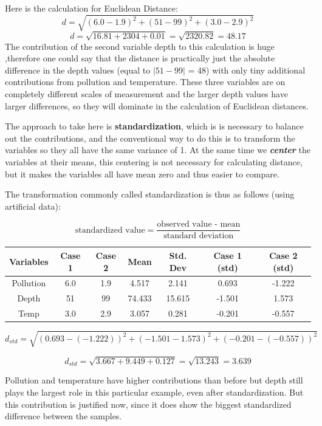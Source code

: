 \documentclass[a4paper,12pt]{report}
\begin{document}
Here is the calculation for Euclidean Distance:
\[ d = \sqrt{(6.0 - 1.9)^2 + (51 - 99)^2 + (3.0 - 2.9)^2}   \]
\[ d = \sqrt{16.81 + 2304 + 0.01} = \sqrt{2320.82} = 48.17 \]
\noindent The contribution of the second variable depth to this calculation is huge ,therefore one could say
that the distance is practically just the absolute difference in the depth values (equal to
$|51-99|$ = 48) with only tiny additional contributions from pollution and temperature. These three variables are on
completely different scales of measurement and the larger depth values have larger differences, so they will dominate in the calculation of Euclidean distances.


\noindent The approach to take here is \textbf{standardization}, which is is necessary to balance out the contributions, and the
conventional way to do this is to transform the variables so they all have the same variance
of 1. At the same time we \textbf{\textit{center}} the variables at their means, this centering is not
necessary for calculating distance, but it makes the variables all have mean zero and thus
easier to compare. 

\noindent The transformation commonly called standardization is thus as follows (using artificial data):
{
	\large
\[\mbox{standardized value} = \frac{\mbox{observed value - mean}}{ \mbox{standard deviation}}\]
\begin{center}
	\begin{tabular}{|c|c|c|c|c|c|c|}
		\hline
		Variables & Case 1 & Case 2 & Mean & Std. Dev & Case 1 (std) & Case 2 (std) \\ \hline
		Pollution & 6.0 & 1.9 & 4.517	&	2.141	&	0.693	&	-1.222	\\
		Depth & 51 & 99 & 74.433	&	15.615	&	-1.501	&	1.573	\\
		Temp & 3.0 & 2.9 & 3.057	&	0.281	&	-0.201	&	-0.557	\\
		\hline
	\end{tabular}
\end{center}
}
\[ d_{std} =  \sqrt{(0.693 - (- 1.222))^2 + (-1.501-1.573)^2 + (-0.201-(-0.557))^2} \]

\[ d_{std} = \sqrt{3.667 + 9.449 + 0.127} = \sqrt{13.243} = 3.639 \]

Pollution and temperature have higher contributions than before but depth still plays the
largest role in this particular example, even after standardization. But this contribution is
justified now, since it does show the biggest standardized difference between the samples. 
\end{document}
